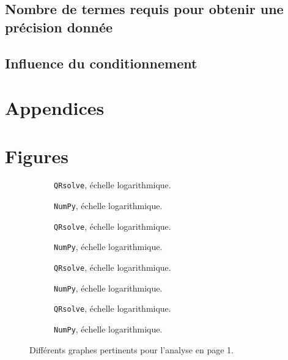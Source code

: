 \documentclass[11pt]{article}
\begin{document}
\subsection{Nombre de termes requis pour obtenir une précision donnée}
\subsection{Influence du conditionnement}
\appendix
\section*{Appendices}
\section{Figures}
\begin{figure}[H]
	\centering
	\begin{subfigure}{0.4\textwidth}
		\centering
		\caption{\texttt{QRsolve}, échelle logarithmique.}
		\label{fig:llqr}
	\end{subfigure}%
	\begin{subfigure}{0.4\textwidth}
		\centering
		\caption{\texttt{NumPy}, échelle logarithmique.}
		\label{fig:llnp}
	\end{subfigure}
	\begin{subfigure}{0.4\textwidth}
		\centering
		\caption{\texttt{QRsolve}, échelle logarithmique.}
		\label{fig:llqr}
	\end{subfigure}%
	\begin{subfigure}{0.4\textwidth}
		\centering
		\caption{\texttt{NumPy}, échelle logarithmique.}
		\label{fig:llnp}
	\end{subfigure}
	\begin{subfigure}{0.4\textwidth}
		\centering
		\caption{\texttt{QRsolve}, échelle logarithmique.}
		\label{fig:llqr}
	\end{subfigure}%
	\begin{subfigure}{0.4\textwidth}
		\centering
		\caption{\texttt{NumPy}, échelle logarithmique.}
		\label{fig:llnp}
	\end{subfigure}
	\begin{subfigure}{0.4\textwidth}
		\centering
		\caption{\texttt{QRsolve}, échelle logarithmique.}
		\label{fig:llqr}
	\end{subfigure}%
	\begin{subfigure}{0.4\textwidth}
		\centering
		\caption{\texttt{NumPy}, échelle logarithmique.}
		\label{fig:llnp}
	\end{subfigure}
	\caption{Différents graphes pertinents pour l'analyse en page 1.}
	\label{fig:manmade}
\end{figure}
\end{document}

